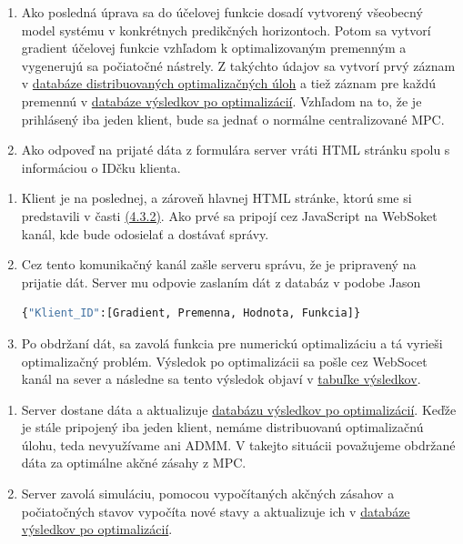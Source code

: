 \begin{description}
{\begin{enumerate}
{		}
		\item{
			 Ako posledná úprava sa do účelovej funkcie dosadí vytvorený všeobecný model systému v konkrétnych predikčných horizontoch. Potom sa vytvorí gradient účelovej funkcie vzhľadom k optimalizovaným premenným a vygenerujú sa počiatočné nástrely. Z takýchto údajov sa vytvorí prvý záznam v \hyperref[DB:WORKER]{databáze distribuovaných optimalizačných úloh} a tiež záznam pre každú premennú v \hyperref[DB:WORKER_DATA]{databáze výsledkov po optimalizácií}. Vzhľadom na to, že je prihlásený iba jeden klient, bude sa jednať o normálne centralizované MPC.
		}
		\item{
			Ako odpoveď na prijaté dáta z formulára server vráti HTML stránku spolu s informáciou o IDčku klienta.
		}
	\end{enumerate}
}
\item[3. Klient 1:]{\hfill
\begin{enumerate}
\item{
Klient je na poslednej, a zároveň hlavnej HTML stránke, ktorú sme si predstavili v časti \hyperref[subse:OPTaSIM]{(4.3.2)}. Ako prvé sa pripojí cez JavaScript na WebSoket kanál, kde bude odosielať a dostávať správy.
}
\item{
Cez tento komunikačný kanál zašle serveru správu, že je pripravený na prijatie dát. Server mu odpovie zaslaním dát z databáz v podobe Jason
\begin{lstlisting}[language=Python]
{"Klient_ID":[Gradient, Premenna, Hodnota, Funkcia]}
\end{lstlisting}
}
\item{Po obdržaní dát, sa zavolá funkcia pre numerickú optimalizáciu a tá vyrieši optimalizačný problém. Výsledok po optimalizácii sa pošle cez WebSocet kanál na sever a následne sa tento výsledok objaví v \hyperref[fig:Tabulka]{tabuľke výsledkov}.}
\end{enumerate}
}
\item[4. Server:]{\hfill
\begin{enumerate}
\item{
Server dostane dáta a aktualizuje \hyperref[DB:WORKER_DATA]{databázu výsledkov po optimalizácií}. Keďže je stále pripojený iba jeden klient, nemáme distribuovanú optimalizačnú úlohu, teda nevyužívame ani ADMM. V takejto situácii považujeme obdržané dáta za optimálne akčné zásahy z MPC.
}
\item{
Server zavolá simuláciu, pomocou vypočítaných akčných zásahov a počiatočných stavov vypočíta nové stavy a aktualizuje ich v \hyperref[DB:WORKER_DATA]{databáze výsledkov po optimalizácií}.
}
\end{enumerate}}
\end{description}
